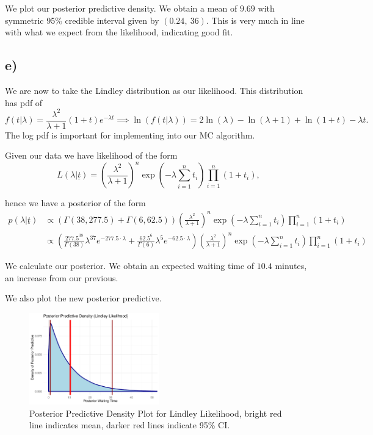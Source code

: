 \documentclass[10pt]{extarticle}
\begin{document}
We plot our posterior predictive density. We obtain a mean of $9.69$ with symmetric 95\% credible interval given by $(0.24, \  36)$. This is very much in line with what we expect from the likelihood, indicating good fit. 

\subsection*{e)}
We are now to take the Lindley distribution as our likelihood. This distribution has pdf of
\[
f(t|\lambda) = \frac{\lambda^2}{\lambda+1}(1+t)e^{-\lambda t} \implies \ln(f(t|\lambda)) = 2\ln(\lambda) - \ln(\lambda + 1) + \ln(1+t) - \lambda t.
\]
The log pdf is important for implementing into our MC algorithm.  

Given our data we have likelihood of the form 
\[
L(\lambda|\underline{t}) = \left(\frac{\lambda^2}{\lambda+1}\right)^n\exp\left(-\lambda\sum_{i=1}^{n}t_i\right)\prod_{i=1}^{n}(1+t_i),
\]

hence we have a posterior of the form
\begin{align*}
p(\lambda|\underline{t}) &\propto \left(\Gamma(38, 277.5) + \Gamma(6, 62.5)\right)\left(\frac{\lambda^2}{\lambda+1}\right)^n\exp\left(-\lambda\sum_{i=1}^{n}t_i\right)\prod_{i=1}^{n}(1+t_i)\\
&\propto \left(\frac{277.5^{38}}{\Gamma(38)}\lambda^{37}e^{-277.5\cdot \lambda} + \frac{62.5^6}{\Gamma(6)}\lambda^{5}e^{-62.5\cdot \lambda}\right)\left(\frac{\lambda^2}{\lambda+1}\right)^n\exp\left(-\lambda\sum_{i=1}^{n}t_i\right)\prod_{i=1}^{n}(1+t_i)
\end{align*}

We calculate our posterior. We obtain an expected waiting time of $10.4$ minutes, an increase from our previous.

We also plot the new posterior predictive. 

\begin{figure}[H]
	\centering
	\includegraphics[width = 0.5\textwidth]{../ppredlinddens}
	\caption{Posterior Predictive Density Plot for Lindley Likelihood, bright red line indicates mean, darker red lines indicate 95\% CI.}
	\label{fig:postpredlinddens}
\end{figure}
\end{document}
